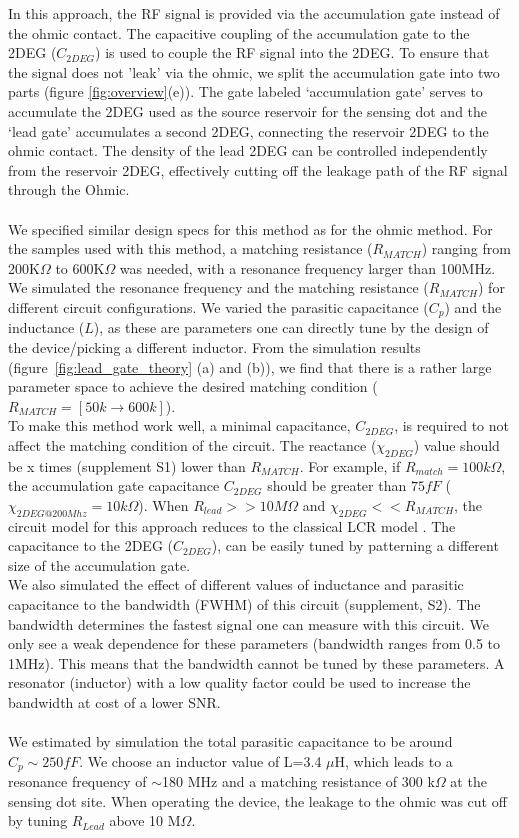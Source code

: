\documentclass{article}
\begin{document}
	In this approach, the RF signal is provided via the accumulation gate\cite{Volk2019} instead of the ohmic contact. The capacitive coupling of the accumulation gate to the 2DEG ($C_{2DEG}$) is used to couple the RF signal into the 2DEG. To ensure that the signal does not 'leak' via the ohmic, we  split the accumulation gate into two parts (figure \ref{fig:overview}(e)).
	The gate labeled ‘accumulation gate’ serves to accumulate the 2DEG used as the source reservoir for the sensing dot and the ‘lead gate’ accumulates a second 2DEG, connecting the reservoir 2DEG to the ohmic contact. The density of the lead 2DEG can be controlled independently from the reservoir 2DEG, effectively cutting off the leakage path of the RF signal through the Ohmic.
	\\ \\
	We specified similar design specs for this method as for the ohmic method. For the samples used with this method, a matching resistance ($R_{MATCH}$) ranging from 200K$\Omega$ to 600K$\Omega$ was needed, with a resonance frequency larger than 100MHz. We simulated the resonance frequency and the matching resistance ($R_{MATCH}$) for different circuit configurations. We varied the parasitic capacitance ($C_p$) and the inductance ($L$), as these are parameters one can directly tune by the design of the device/picking a different inductor. From the simulation results (figure\ \ref{fig:lead_gate_theory} (a) and (b)), we find that there is a rather large parameter space to achieve the desired matching condition ($R_{MATCH} = [50k \rightarrow 600k]$).
	\\
	To make this method work well, a minimal capacitance, $C_{2DEG}$, is required to not affect the matching condition of the circuit. The reactance ($\chi_{2DEG}$) value should be x times (supplement S1) lower than $R_{MATCH}$. For example, if $R_{match}=100k\Omega$, the accumulation gate capacitance $C_{2DEG}$ should be greater than $75fF$ ($\chi_{2DEG@200 Mhz} = 10k\Omega$). When $R_{lead} >> 10M\Omega$ and $\chi_{2DEG} << R_{MATCH}$, the circuit model for this approach reduces to the classical LCR model
	\cite{taskinen2008radio}. The capacitance to the 2DEG ($C_{2DEG}$), can be easily tuned by patterning a different size of the accumulation gate.
	\\
	We also simulated the effect of different values of inductance and parasitic capacitance to the bandwidth (FWHM) of this circuit (supplement, S2). The bandwidth determines the fastest signal one can measure with this circuit. We only see a weak dependence for these parameters (bandwidth ranges from 0.5 to 1MHz). This means that the bandwidth cannot be tuned by these parameters. A resonator (inductor) with a low quality factor could be used to increase the bandwidth at cost of a lower SNR.
	\\ \\ 
	We estimated by simulation the total parasitic capacitance to be around $C_p \sim 250fF$. We choose an inductor value of L=3.4 $\mu$H, which leads to a resonance frequency of $\sim$180 MHz and a matching resistance of 300 k$\Omega$ at the sensing dot site.
	When operating the device, the leakage to the ohmic was cut off by tuning $R_{Lead}$ above 10 M$\Omega$.
\end{document}

